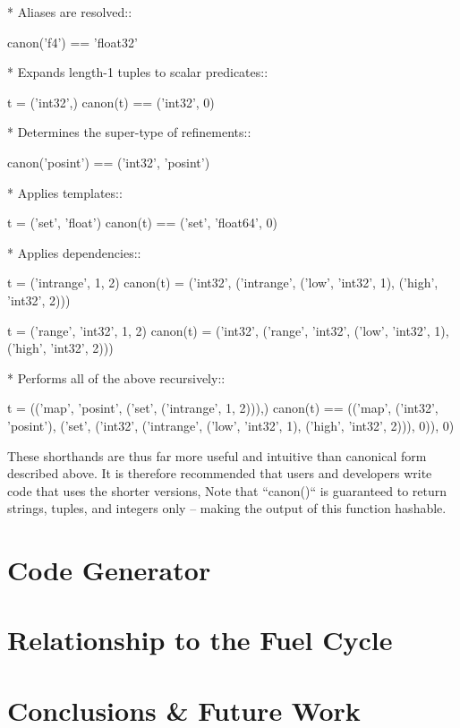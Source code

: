 \documentclass{ansconfpaper}
\begin{document}
* Aliases are resolved::

    canon('f4') == 'float32'

* Expands length-1 tuples to scalar predicates::

    t = ('int32',)
    canon(t) == ('int32', 0)

* Determines the super-type of refinements::

    canon('posint') == ('int32', 'posint')

* Applies templates::

    t = ('set', 'float')
    canon(t) == ('set', 'float64', 0)

* Applies dependencies:: 

    t = ('intrange', 1, 2)
    canon(t) = ('int32', ('intrange', ('low', 'int32', 1), ('high', 'int32', 2)))

    t = ('range', 'int32', 1, 2)
    canon(t) = ('int32', ('range', 'int32', ('low', 'int32', 1), ('high', 'int32', 2)))

* Performs all of the above recursively::

    t = (('map', 'posint', ('set', ('intrange', 1, 2))),)
    canon(t) == (('map', 
                 ('int32', 'posint'),  
                 ('set', ('int32', 
                    ('intrange', ('low', 'int32', 1), ('high', 'int32', 2))), 0)), 0)

These shorthands are thus far more useful and intuitive than canonical form described
above.  It is therefore recommended that users and developers write code that uses
the shorter versions, Note that ``canon()`` is guaranteed to return strings, tuples, 
and integers only -- making the output of this function hashable.


\section{Code Generator}
\label{sec:codegen}

\section{Relationship to the Fuel Cycle}
\label{sec:fc}

\section{Conclusions \& Future Work}
\label{sec:conc}


\setlength{\baselineskip}{12pt}



\end{document}

